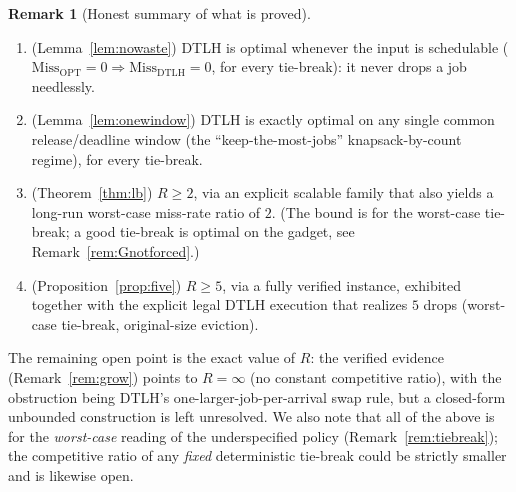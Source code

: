 \documentclass{amsart}
\theoremstyle{definition}
\newtheorem{remark}[theorem]{Remark}
\begin{document}
\begin{remark}[Honest summary of what is proved]
\begin{enumerate}
\item (Lemma~\ref{lem:nowaste}) DTLH is optimal whenever the input is
schedulable ($\mathrm{Miss}_{\mathrm{OPT}}=0\Rightarrow
\mathrm{Miss}_{\mathrm{DTLH}}=0$, for every tie-break): it never drops a job
needlessly.
\item (Lemma~\ref{lem:onewindow}) DTLH is exactly optimal on any single common
release/deadline window (the ``keep-the-most-jobs'' knapsack-by-count regime),
for every tie-break.
\item (Theorem~\ref{thm:lb}) $R\ge 2$, via an explicit scalable family that also
yields a long-run worst-case miss-rate ratio of $2$. (The bound is for the
worst-case tie-break; a good tie-break is optimal on the gadget, see
Remark~\ref{rem:Gnotforced}.)
\item (Proposition~\ref{prop:five}) $R\ge 5$, via a fully verified instance,
exhibited together with the explicit legal DTLH execution that realizes $5$
drops (worst-case tie-break, original-size eviction).
\end{enumerate}
The remaining open point is the exact value of $R$: the verified evidence
(Remark~\ref{rem:grow}) points to $R=\infty$ (no constant competitive ratio),
with the obstruction being DTLH's one-larger-job-per-arrival swap rule, but a
closed-form unbounded construction is left unresolved. We also note that all of
the above is for the \emph{worst-case} reading of the underspecified policy
(Remark~\ref{rem:tiebreak}); the competitive ratio of any \emph{fixed}
deterministic tie-break could be strictly smaller and is likewise open.
\end{remark}
\end{document}
